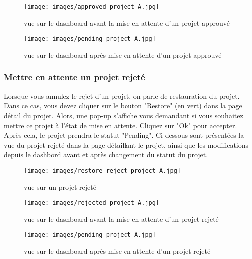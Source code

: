 \documentclass[12pt]{article}
\begin{document}
    \medskip

        \begin{figure}[h!]
            \centering
            \texttt{[image: images/approved-project-A.jpg]}
            \caption{vue sur le dashboard avant la mise en attente d'un projet approuvé}
            \label{dashboard avant mise en attente pour projet approuvé}
        \end{figure}

    \medskip

        \begin{figure}[h!]
            \centering
            \texttt{[image: images/pending-project-A.jpg]}
            \caption{vue sur le dashboard après mise en attente d'un projet approuvé}
            \label{dashboard après mise en attente d'un projet approuvé}
        \end{figure}

    \medskip
\newpage
\subsubsection{Mettre en attente un projet rejeté}
Lorsque vous annulez le rejet d'un projet, on parle de restauration du projet. Dans ce cas, vous devez cliquer sur le bouton "Restore" (en vert) dans la page détail du projet. Alors, une pop-up s'affiche vous demandant si vous souhaitez mettre ce projet à l'état de mise en attente. Cliquez sur "Ok" pour accepter. Après cela, le projet prendra le statut "Pending". Ci-dessous sont présentées la vue du projet rejeté dans la page détaillant le projet, ainsi que les modifications depuis le dashbord avant et après changement du statut du projet. 
        \begin{figure}[h!]
            \centering
            \texttt{[image: images/restore-reject-project-A.jpg]}
            \caption{vue sur un projet rejeté}
            \label{vue sur un projet rejeté}
        \end{figure}
    \smallskip
        \begin{figure}[h!]
            \centering
            \texttt{[image: images/rejected-project-A.jpg]}
            \caption{vue sur le dashboard avant la mise en attente d'un projet rejeté}
            \label{dashboard avant mise en attente pour projet rejeté}
        \end{figure}
    \medskip
        \begin{figure}[h!]
            \centering
            \texttt{[image: images/pending-project-A.jpg]}
            \caption{vue sur le dashboard après mise en attente d'un projet rejeté}
            \label{dashboard après mise en attente d'un projet rejeté}
        \end{figure}
\end{document}
